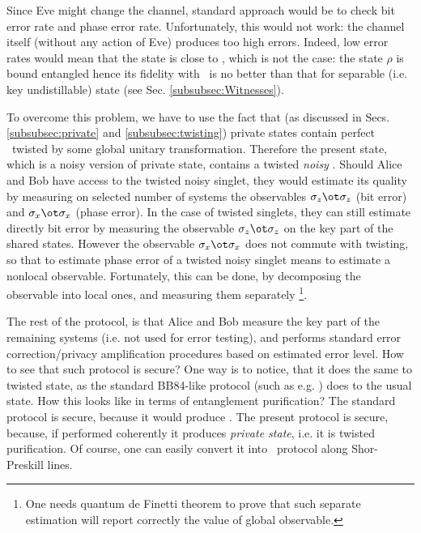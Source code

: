 \documentclass[rmp,12pt,preprint]{revtex4-2}
\begin{document}
Since Eve might change the channel, standard approach would be to
check bit error rate and phase error rate. Unfortunately, this would
not work: the channel itself (without any action of Eve) produces
too high errors. Indeed, low error rates would mean that the state is
close to \wsinglet, which is not the case: the state $\rho$ is bound entangled hence its
fidelity with \wsinglet\ is no better than that for separable (i.e. key undistillable) state (see Sec. \ref{subsubsec:Witnesses}).

To overcome this problem, we have to use the fact that  (as discussed in Secs.
\ref{subsubsec:private} and \ref{subsubsec:twisting}) private states
contain perfect \wsinglet\ twisted by some global unitary transformation.
Therefore the present state, which is a noisy version of private
state, contains a twisted {\it noisy} \wsinglet.
Should Alice and Bob have access to the twisted noisy singlet,
they would estimate its quality by measuring on selected number of systems
the observables $\sigma_z\ot \sigma_z$ (bit error) and $\sigma_x\ot \sigma_x$ (phase error).
In the case of twisted singlets, they can still estimate directly bit error by
measuring the observable $\sigma_z\ot \sigma_z$ on the key part
of the shared states. However the observable $\sigma_x\ot \sigma_x$
does not commute with twisting, so that to estimate phase error of a twisted
noisy singlet means to estimate a nonlocal observable.
Fortunately, this can be done, by decomposing the
observable into local ones, and measuring them separately
\footnote{One needs quantum de Finetti theorem to prove that such
separate estimation will report correctly the value of global
observable.}.

The rest of the protocol, is that Alice and Bob measure the key part
of the remaining systems (i.e. not used for error testing),
and performs standard error correction/privacy amplification
procedures based on estimated error level.
How to see that such protocol is secure? One way is to notice, that it does the same to
twisted state, as the standard BB84-like protocol  (such as e.g. \cite{LoChauArdehali2000,lca}) does to the usual state. How
this looks like in terms of entanglement purification? The standard
protocol is secure, because it would produce \singlets. The present
protocol is secure, because, if performed coherently it produces
{\it private state}, i.e. it is twisted purification. Of course, one
can easily convert it into \pmp\ protocol along Shor-Preskill lines.
\end{document}
